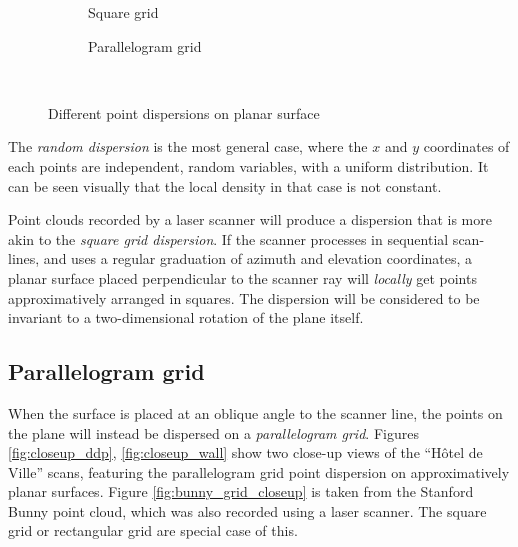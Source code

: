 \begin{figure}[H]
\begin{subfigure}{.3\textwidth}
{	\caption{Square grid}
}
\end{subfigure}%
\hfill%
\begin{subfigure}{.3\textwidth}
{
	\setlength{\fboxsep}{0pt}%
	\setlength{\fboxrule}{0.5pt}%
	\caption{Parallelogram grid}
}%
\end{subfigure}\\
\caption{Different point dispersions on planar surface}
\label{fig:point_dispersion}
\end{figure}

The \emph{random dispersion} is the most general case, where the $x$ and $y$ coordinates of each points are independent, random variables, with a uniform distribution. It can be seen visually that the local density in that case is not constant.

Point clouds recorded by a laser scanner will produce a dispersion that is more akin to the \emph{square grid dispersion}. If the scanner processes in sequential scan-lines, and uses a regular graduation of azimuth and elevation coordinates, a planar surface placed perpendicular to the scanner ray will \emph{locally} get points approximatively arranged in squares. The dispersion will be considered to be invariant to a two-dimensional rotation of the plane itself.

\subsection{Parallelogram grid}
When the surface is placed at an oblique angle to the scanner line, the points on the plane will instead be dispersed on a \emph{parallelogram grid}. Figures \ref{fig:closeup_ddp}, \ref{fig:closeup_wall} show two close-up views of the ``Hôtel de Ville'' scans, featuring the parallelogram grid point dispersion on approximatively planar surfaces. Figure \ref{fig:bunny_grid_closeup} is taken from the Stanford Bunny point cloud, which was also recorded using a laser scanner. The square grid or rectangular grid are special case of this.

